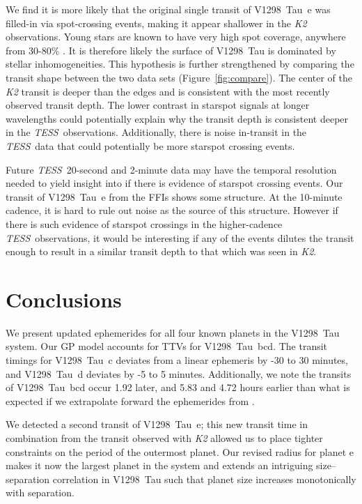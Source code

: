 \documentclass[twocolumn]{aastex631}
\newcommand{\tess}{\textit{TESS}}
\newcommand{\sname}{V1298~Tau\xspace}
\newcommand{\planetc}{V1298~Tau~c\xspace}
\newcommand{\planetd}{V1298~Tau~d\xspace}
\newcommand{\planete}{V1298~Tau~e\xspace}
\newcommand{\planetknown}{V1298~Tau~bcd\xspace}
\begin{document}
We find it is more likely that the original single transit of \planete was filled-in via spot-crossing events, making it appear shallower in the \textit{K2} observations. Young stars are known to have very high spot coverage, anywhere from 30-80\% \citep[][]{grankin99, gully17, feinstein20}. It is therefore likely the surface of \sname is dominated by stellar inhomogeneities. This hypothesis is further strengthened by comparing the transit shape between the two data sets (Figure~\ref{fig:compare}). The center of the \textit{K2} transit is deeper than the edges and is consistent with the most recently observed transit depth. The lower contrast in starspot signals at longer wavelengths could potentially explain why the transit depth is consistent deeper in the \tess\ observations. Additionally, there is noise in-transit in the \tess\ data that could potentially be more starspot crossing events.


Future \tess\ 20-second and 2-minute data may have the temporal resolution needed to yield insight into if there is evidence of starspot crossing events. Our transit of \planete from the FFIs shows some structure. At the 10-minute cadence, it is hard to rule out noise as the source of this structure. However if there is such evidence of starspot crossings in the higher-cadence \tess\ observations, it would be interesting if any of the events dilutes the transit enough to result in a similar transit depth to that which was seen in \textit{K2}. 

\section{Conclusions} \label{sec:conclusions}

We present updated ephemerides for all four known planets in the \sname system. Our GP model accounts for TTVs for \planetknown. The transit timings for \planetc deviates from a linear ephemeris by -30 to 30 minutes, and \planetd deviates by -5 to 5 minutes. Additionally, we note the transits of \planetknown occur 1.92 later, and 5.83 and 4.72 hours earlier than what is expected if we extrapolate forward the ephemerides from \cite{David2019b}.

We detected a second transit of \planete; this new transit time in combination from the transit observed with \textit{K2} allowed us to place tighter constraints on the period of the outermost planet. Our revised radius for planet e makes it now the largest planet in the system and extends an intriguing size--separation correlation in \sname such that planet size increases monotonically with separation.
\end{document}
